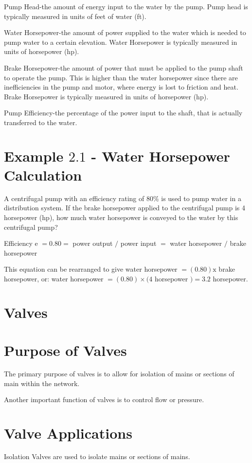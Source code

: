 \documentclass[10pt]{article}
\begin{document}
Pump Head-the amount of energy input to the water by the pump. Pump head is typically measured in units of feet of water (ft).

Water Horsepower-the amount of power supplied to the water which is needed to pump water to a certain elevation. Water Horsepower is typically measured in units of horsepower (hp).

Brake Horsepower-the amount of power that must be applied to the pump shaft to operate the pump. This is higher than the water horsepower since there are inefficiencies in the pump and motor, where energy is lost to friction and heat. Brake Horsepower is typically measured in units of horsepower (hp).

Pump Efficiency-the percentage of the power input to the shaft, that is actually transferred to the water.

\section{Example $2.1$ - Water Horsepower Calculation}
A centrifugal pump with an efficiency rating of $80 \%$ is used to pump water in a distribution system. If the brake horsepower applied to the centrifugal pump is 4 horsepower (hp), how much water horsepower is conveyed to the water by this centrifugal pump?

Efficiency e $=0.80=$ power output $/$ power input $=$ water horsepower $/$ brake horsepower

This equation can be rearranged to give water horsepower $=(0.80) \mathrm{x}$ brake horsepower, or: water horsepower $=(0.80) \times(4$ horsepower $)=3.2$ horsepower.

\section{Valves}
\section{Purpose of Valves}
The primary purpose of valves is to allow for isolation of mains or sections of main within the network.

Another important function of valves is to control flow or pressure.

\section{Valve Applications}
Isolation Valves are used to isolate mains or sections of mains.
\end{document}
